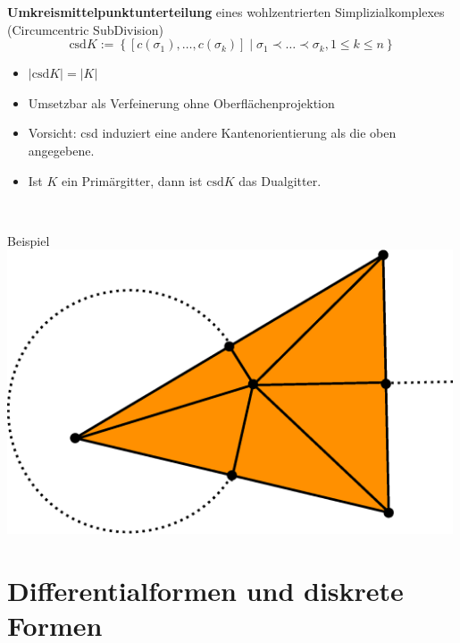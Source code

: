 \documentclass[handout]{beamer}
\begin{document}
  \begin{frame}
    \begin{block}{\textbf{Umkreismittelpunktunterteilung} eines wohlzentrierten Simplizialkomplexes (Circumcentric SubDivision)}
      \[ \text{csd}K := \left\{ \left[c(\sigma_{1}),\ldots,c(\sigma_{k})\right] \middle| \sigma_{1} \prec \ldots \prec \sigma_{k}, 1 \le k \le n \right\} \]
    \end{block}
    \begin{minipage}{0.5\textwidth}
      \begin{itemize}
        \item<2-> \( |\text{csd}K| = |K| \)
        \item<3-> Umsetzbar als Verfeinerung ohne Oberflächenprojektion
        \item<4-> Vorsicht: csd induziert eine andere Kantenorientierung als die oben angegebene.
        \item<5-> Ist \( K \) ein Primärgitter, dann ist \( \text{csd}K \) das Dualgitter.
      \end{itemize}
    \end{minipage} \, 
    \begin{minipage}{0.45\textwidth}
      \begin{block}{Beispiel}
        \centering\includegraphics[width=0.99\textwidth]{bilder/inkscape/subdivision2.eps}
      \end{block}
    \end{minipage}
  \end{frame}

  
  \section{Differentialformen und diskrete Formen}
\end{document}
